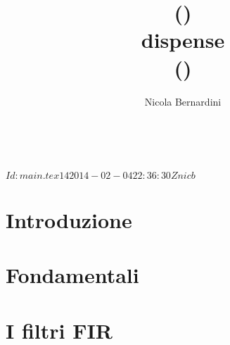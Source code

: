 \documentclass{scrbook}
\title{%
	\topic (\topicacro)\\dispense\\{\tiny (\rcstag)}%
}
\author{Nicola Bernardini\\[2cm]\license}
\date{~}
\newcommand{\dirroot}{..}
\begin{document}
\svnInfo $Id: main.tex 14 2014-02-04 22:36:30Z nicb $

\maketitle

\tableofcontents

\chapter{Introduzione\label{chap:introduction}}



\chapter{Fondamentali\label{chap:fundamentals}}









\chapter{I filtri FIR\label{chap:fir}}


















\end{document}
